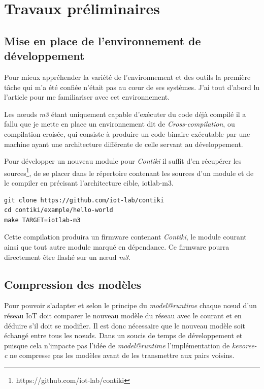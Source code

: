 \section{Travaux préliminaires}
\subsection{Mise en place de l'environnement de développement}
Pour mieux appréhender la variété de l'environnement et des outils la première tâche qui m'a été confiée n'était pas au cœur de ses systèmes. J'ai tout d'abord lu l'article \citep{acostapadilla} pour me familiariser avec cet environnement. 

Les nœuds \emph{m3} étant uniquement capable d'exécuter du code déjà compilé il a fallu que je mette en place un environnement dit de \emph{Cross-compilation}, ou compilation croisée, qui consiste à produire un code binaire exécutable par une machine ayant une architecture différente de celle servant au développement.

Pour développer un nouveau module pour \emph{Contiki} il suffit d'en récupérer les sources\footnote{https://github.com/iot-lab/contiki}, de se placer dans le répertoire contenant les sources d'un module et de le compiler en précisant l'architecture cible, iotlab-m3.

\lstset{language=bash, captionpos=b, caption=Résumé des étapes de compilation}
\begin{lstlisting}[frame=single]
git clone https://github.com/iot-lab/contiki
cd contiki/example/hello-world
make TARGET=iotlab-m3
\end{lstlisting}

Cette compilation produira un firmware contenant \emph{Contiki}, le module courant ainsi que tout autre module marqué en dépendance. Ce firmware pourra directement être flashé sur un nœud \emph{m3}.

\subsection{Compression des modèles}

Pour pouvoir s'adapter et selon le principe du \emph{model@runtime} chaque nœud d'un réseau IoT doit comparer le nouveau modèle du réseau avec le courant et en déduire s'il doit se modifier. Il est donc nécessaire que le nouveau modèle soit échangé entre tous les nœuds. Dans un soucis de temps de développement et puisque cela n'impacte pas l'idée de \emph{model@runtime} l'implémentation de \emph{kevoree-c} ne compresse pas les modèles avant de les transmettre aux pairs voisins.

